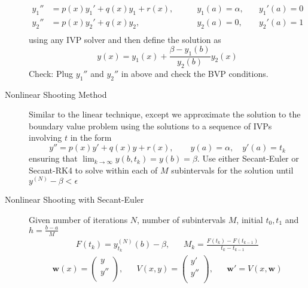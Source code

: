 \documentclass[8pt]{article}
\begin{document}
\begin{multicols}{2}
\begin{description}
\begin{equation*}
      \begin{aligned}
        y_1'' &= p(x)y_1' + q(x)y_1 + r(x), &\qquad y_1(a)=\alpha,&\quad y_1'(a)=0 \\
        y_2'' &= p(x)y_2' + q(x)y_2, &\qquad y_2(a)=0,&\quad y_2'(a) = 1\\
      \end{aligned}
    \end{equation*}
    using any IVP solver and then define the solution as
    $$ y(x) = y_1(x)+\frac{\beta - y_1(b)}{y_2(b)}y_2(x) $$
    Check: Plug $y_1''$ and $y_2''$ in above and check the BVP
    conditions.
  \item[Nonlinear Shooting Method] Similar to the linear technique,
    except we approximate the solution to the boundary value problem
    using the solutions to a sequence of IVPs involving $t$ in the
    form
    $$ y'' = p(x)y' + q(x)y + r(x), \qquad y(a)=\alpha,\quad y'(a)=t_k $$
    ensuring that $\lim_{k\rightarrow\infty}y(b,t_k)=y(b)=\beta$.
    Use either Secant-Euler or Secant-RK4 to solve within each of $M$
    subintervals for the solution until $y^{(N)}-\beta < \epsilon$
  \item[Nonlinear Shooting with Secant-Euler] Given number of iterations $N$,
    number of subintervals $M$, initial $t_0, t_1$ and $h=\frac{b-a}{M}$
    \begin{equation*}
      \begin{aligned}
        F(t_k) = y^{(N)}_{t_k}(b) - \beta, &&
        M_k = \frac{F(t_{k})-F(t_{k-1})}{t_{k}-t_{k-1}}
      \end{aligned}
    \end{equation*}
    \begin{equation*}
      \begin{aligned}
         \mathbf{w}(x) = \begin{pmatrix}
          y \\
          y'' \\
        \end{pmatrix}, && V(x,y) =
        \begin{pmatrix}
          y' \\
          y'' \\
        \end{pmatrix}, && \mathbf{w}' = V(x,\mathbf{w})
      \end{aligned}
    \end{equation*}

\end{description}
\end{multicols}
\end{document}
